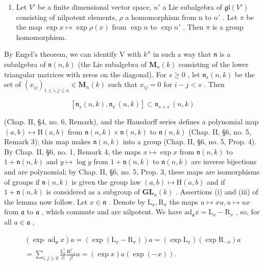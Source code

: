 \begin{enumerate}
\def\labelenumi{(\roman{enumi})}
\setcounter{enumi}{2}
\tightlist
\item
  Let \(V'\) be a finite dimensional vector space, \(n'\) a Lie subalgebra of \(\mathfrak{gl}(V')\) consisting of nilpotent elements, \(\rho\) a homomorphism from n to \(n'\) . Let \(\pi\) be the map \(\exp x \mapsto \exp \rho(x)\) from \(\exp n\) to \(\exp n'\) . Then \(\pi\) is a group homomorphism.
\end{enumerate}

By Engel's theorem, we can identify V with \(k^n\) in such a way that \(\mathfrak{n}\) is a subalgebra of \(\mathfrak{n}(n,k)\) (the Lie subalgebra of \(\mathbf{M}_n(k)\) consisting of the lower triangular matrices with zeros on the diagonal). For \(s \geq 0\) , let \(\mathfrak{n}_s(n,k)\) be the set of \((x_{ij})_{1 \leq i,j \leq n} \in \mathbf{M}_n(k)\) such that \(x_{ij} = 0\) for \(i - j < s\) . Then

\[
[ \mathfrak {n} _ {s} (n, k), \mathfrak {n} _ {s ^ {\prime}} (n, k) ] \subset \mathfrak {n} _ {s + s ^ {\prime}} (n, k)
\]

(Chap. II, §4, no. 6, Remark), and the Hausdorff series defines a polynomial map \((a,b)\mapsto\mathrm{H}(a,b)\) from \(\mathfrak{n}(n,k)\times\mathfrak{n}(n,k)\) to \(\mathfrak{n}(n,k)\) (Chap. II, §6, no. 5, Remark 3); this map makes \(\mathfrak{n}(n,k)\) into a group (Chap. II, §6, no. 5, Prop. 4). By Chap. II, §6, no. 1, Remark 4, the maps \(x\mapsto\exp x\) from \(\mathfrak{n}(n,k)\) to \(1+\mathfrak{n}(n,k)\) and \(y\mapsto\log y\) from \(1+\mathfrak{n}(n,k)\) to \(\mathfrak{n}(n,k)\) are inverse bijections and are polynomial; by Chap. II, §6, no. 5, Prop. 3, these maps are isomorphisms of groups if \(\mathfrak{n}(n,k)\) is given the group law \((a,b)\mapsto\mathrm{H}(a,b)\) and if \(1+\mathfrak{n}(n,k)\) is considered as a subgroup of \(\mathbf{GL}_{n}(k)\) . Assertions (i) and (iii) of the lemma now follow. Let \(x\in\mathfrak{n}\) . Denote by \(\mathrm{L}_{x},\mathrm{R}_{x}\) the maps \(u\mapsto xu,u\mapsto ux\) from \(\mathfrak{a}\) to \(\mathfrak{a}\) , which commute and are nilpotent. We have \(\mathrm{ad}_{\mathfrak{a}}x=\mathrm{L}_{x}-\mathrm{R}_{x}\) , so, for all \(a\in\mathfrak{a}\) ,

\[
\begin{array}{c} (\exp \operatorname{ad} _ {\mathfrak {a}} x) a = (\exp (\mathrm{L} _ {x} - \mathrm{R} _ {x})) a = (\exp \mathrm{L} _ {x}) (\exp \mathrm{R} _ {- x}) a \\ = \sum_ {i, j \geq 0} \frac {\mathrm{L} _ {x} ^ {i}}{i !} \frac {\mathrm{R} _ {- x} ^ {j}}{j !} a = (\exp x) a (\exp (- x)). \end{array}\tag{1}
\]

